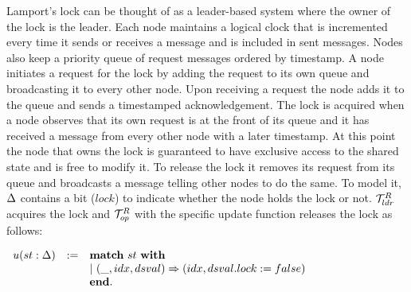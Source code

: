 Lamport's lock can be thought of as a leader-based system where the owner of
the lock is the leader.
Each node maintains a logical clock that is incremented every time it sends or
receives a message and is included in sent messages.
Nodes also keep a priority queue of request messages ordered by timestamp.
A node initiates a request for the lock by adding the request to its own queue
and broadcasting it to every other node.
Upon receiving a request the node adds it to the queue and sends a timestamped
acknowledgement.
The lock is acquired when a node observes that its own request is at the front
of its queue and it has received a message from every other node with a later
timestamp.
At this point the node that owns the lock is guaranteed to have exclusive
access to the shared state and is free to modify it.
To release the lock it removes its request from its queue and broadcasts a
message telling other nodes to do the same.
To model it, $\Delta$ contains a bit ($lock$) to indicate whether the node holds the lock or not.
$\mathcal{T}^{R}_{ldr}$ acquires the lock and $\mathcal{T}^{R}_{op}$ with the specific update function 
releases the lock as follows:
\begin{center}
$
\begin{array}{lll}
u (st : \dsvalue)&:=& \mbox{\textbf{match}} \ st \ \mbox{\textbf{with}}\\
&&\vert~(\_, idx, dsval) \Rightarrow (idx, dsval.lock := false)\\
 && \mbox{\textbf{end}}.\\
\end{array}
$
\end{center}
